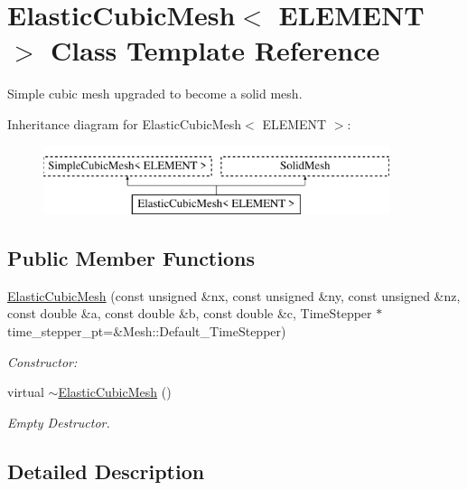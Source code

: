 \hypertarget{classElasticCubicMesh}{}\section{Elastic\+Cubic\+Mesh$<$ E\+L\+E\+M\+E\+NT $>$ Class Template Reference}
\label{classElasticCubicMesh}


Simple cubic mesh upgraded to become a solid mesh.  


Inheritance diagram for Elastic\+Cubic\+Mesh$<$ E\+L\+E\+M\+E\+NT $>$\+:\begin{figure}[H]
\begin{center}
\leavevmode
\includegraphics[height=2.000000cm]{classElasticCubicMesh}
\end{center}
\end{figure}
\subsection*{Public Member Functions}
\begin{DoxyCompactItemize}
\item 
\hyperlink{classElasticCubicMesh_aa09317d23e99358728bd81d0c67410a4}{Elastic\+Cubic\+Mesh} (const unsigned \&nx, const unsigned \&ny, const unsigned \&nz, const double \&a, const double \&b, const double \&c, Time\+Stepper $\ast$time\+\_\+stepper\+\_\+pt=\&Mesh\+::\+Default\+\_\+\+Time\+Stepper)
\begin{DoxyCompactList}\small\item\em Constructor\+: \end{DoxyCompactList}\item 
virtual \hyperlink{classElasticCubicMesh_a64cc078916561417462636f399a71e88}{$\sim$\+Elastic\+Cubic\+Mesh} ()
\begin{DoxyCompactList}\small\item\em Empty Destructor. \end{DoxyCompactList}\end{DoxyCompactItemize}


\subsection{Detailed Description}
